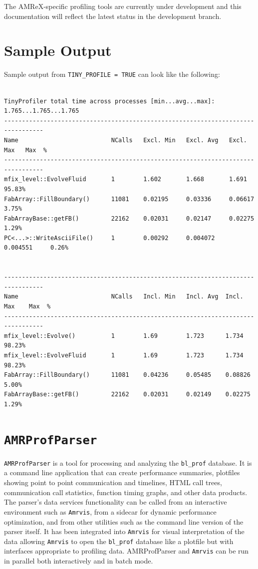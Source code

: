 The AMReX-specific profiling tools are currently under development and this documentation will reflect the latest 
status in the development branch.

\section{Sample Output}

Sample output from {\tt TINY\_PROFILE = TRUE} can look like the following:


\begin{lstlisting}[basicstyle=\tiny,tabsize=1]

TinyProfiler total time across processes [min...avg...max]: 1.765...1.765...1.765
---------------------------------------------------------------------------------
Name                          NCalls   Excl. Min   Excl. Avg   Excl. Max   Max  %
---------------------------------------------------------------------------------
mfix_level::EvolveFluid       1        1.602       1.668       1.691       95.83%
FabArray::FillBoundary()      11081    0.02195     0.03336     0.06617      3.75%
FabArrayBase::getFB()         22162    0.02031     0.02147     0.02275      1.29%
PC<...>::WriteAsciiFile()     1        0.00292     0.004072    0.004551     0.26%


---------------------------------------------------------------------------------
Name                          NCalls   Incl. Min   Incl. Avg  Incl. Max    Max  %
---------------------------------------------------------------------------------
mfix_level::Evolve()          1        1.69        1.723      1.734        98.23%
mfix_level::EvolveFluid       1        1.69        1.723      1.734        98.23%
FabArray::FillBoundary()      11081    0.04236     0.05485    0.08826       5.00%
FabArrayBase::getFB()         22162    0.02031     0.02149    0.02275       1.29%

\end{lstlisting}

\section{\tt AMRProfParser} 

{\tt AMRProfParser} is a tool for processing and analyzing the {\tt bl\_prof} database.  It is a
command line application that can create performance summaries, plotfiles showing
point to point communication and timelines, HTML call trees, communication call
statistics, function timing graphs, and other data products.  The parser's data
services functionality can be called from an interactive environment such as {\tt Amrvis},
from a sidecar for dynamic performance optimization, and from other utilities such as
the command line version of the parser itself.  It has been integrated into {\tt Amrvis}
for visual interpretation of the data allowing {\tt Amrvis} to open the {\tt bl\_prof} database
like a plotfile but with interfaces appropriate to profiling data. AMRProfParser
and {\tt Amrvis} can be run in parallel both interactively and in batch mode.

